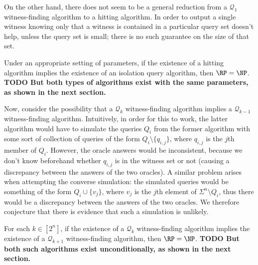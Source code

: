 \documentclass{article}
\newcommand{\todo}[1]{\textbf{TODO #1}}
\newcommand{\mc}{\mathcal}
\begin{document}
On the other hand, there does not seem to be a general reduction from a $\mc{Q}_1$ witness-finding algorithm to a hitting algorithm.
In order to output a single witness knowing only that a witness is contained in a particular query set doesn't help, unless the query set is small; there is no such guarantee on the size of that set.

\begin{conjecture}
  Under an appropriate setting of parameters, if the existence of a hitting algorithm implies the existence of an isolation query algorithm, then $\RP = \NP$.
  \todo{But both types of algorithms exist with the same parameters, as shown in the next section.}
\end{conjecture}

Now, consider the possibility that a $\mc{Q}_k$ witness-finding algorithm implies a $\mc{Q}_{k - 1}$ witness-finding algorithm.
Intuitively, in order for this to work, the latter algorithm would have to simulate the queries $Q_i$ from the former algorithm with some sort of collection of queries of the form $Q_i \setminus \{q_{i, j}\}$, where $q_{i, j}$ is the $j$th member of $Q_i$.
However, the oracle answers would be inconsistent, because we don't know beforehand whether $q_{i, j}$ is in the witness set or not (causing a discrepancy between the answers of the two oracles).
A similar problem arises when attempting the converse simulation: the simulated queries would be something of the form $Q_i \cup \{v_j\}$, where $v_j$ is the $j$th element of $\Sigma^n \setminus Q_i$, thus there would be a discrepancy between the answers of the two oracles.
We therefore conjecture that there is evidence that such a simulation is unlikely.

\begin{conjecture}
  For each $k \in \left[2^n\right]$, if the existence of a $\mc{Q}_k$ witness-finding algorithm implies the existence of a $\mc{Q}_{k + 1}$ witness-finding algorithm, then $\RP = \NP$.
  \todo{But both such algorithms exist unconditionally, as shown in the next section.}
\end{conjecture}


\end{document}
